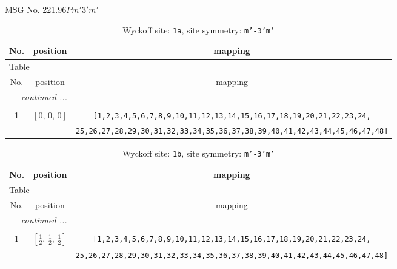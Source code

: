 \documentclass[fleqn,8pt]{jsarticle}
\begin{document}
\setcounter{MaxMatrixCols}{32}

\renewcommand{\tablename}{Table~}
\renewcommand{\figurename}{Figure~}
\begin{center}
\LARGE
MSG No. 221.96\quad$Pm'\bar{3}'m'$
\end{center}
\renewcommand{\arraystretch}{1.2}
\begin{longtable}{ccc}
\caption{Wyckoff site: {\tt 1a}, site symmetry: {\tt m'-3'm'}}
 \\
 \hline \hline
No. & position & mapping \\ \hline \endfirsthead

\multicolumn{2}{l}{\tablename\ \thetable{}} \\
 \hline \hline
No. & position & mapping \\ \hline \endhead

 \hline \hline
\multicolumn{2}{r}{\footnotesize\it continued ...} \\ \endfoot

 \hline \hline
\multicolumn{2}{r}{} \\ \endlastfoot

1 & $\left[ 0,\, 0,\, 0 \right]$ & {\tt [1,2,3,4,5,6,7,8,9,10,11,12,13,14,15,16,17,18,19,20,21,22,23,24,} \\ \hline
 &  & {\tt 25,26,27,28,29,30,31,32,33,34,35,36,37,38,39,40,41,42,43,44,45,46,47,48]} \\
\end{longtable}
\renewcommand{\arraystretch}{1.2}
\begin{longtable}{ccc}
\caption{Wyckoff site: {\tt 1b}, site symmetry: {\tt m'-3'm'}}
 \\
 \hline \hline
No. & position & mapping \\ \hline \endfirsthead

\multicolumn{2}{l}{\tablename\ \thetable{}} \\
 \hline \hline
No. & position & mapping \\ \hline \endhead

 \hline \hline
\multicolumn{2}{r}{\footnotesize\it continued ...} \\ \endfoot

 \hline \hline
\multicolumn{2}{r}{} \\ \endlastfoot

1 & $\left[ \frac{1}{2},\, \frac{1}{2},\, \frac{1}{2} \right]$ & {\tt [1,2,3,4,5,6,7,8,9,10,11,12,13,14,15,16,17,18,19,20,21,22,23,24,} \\ \hline
 &  & {\tt 25,26,27,28,29,30,31,32,33,34,35,36,37,38,39,40,41,42,43,44,45,46,47,48]} \\
\end{longtable}
\end{document}

